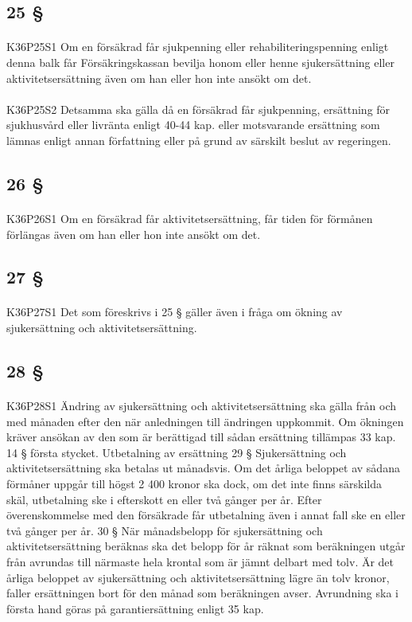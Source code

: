 \documentclass[a4paper,notitlepage,openany,10pt]{book}
\begin{document}
\subsection*{25 §}
\paragraph*{}
{\tiny K36P25S1}
Om en försäkrad får sjukpenning eller rehabiliteringspenning enligt denna balk får Försäkringskassan bevilja honom eller henne sjukersättning eller aktivitetsersättning även om han eller hon inte ansökt om det.
\paragraph*{}
{\tiny K36P25S2}
Detsamma ska gälla då en försäkrad får sjukpenning, ersättning för sjukhusvård eller livränta enligt 40-44 kap.
eller motsvarande ersättning som lämnas enligt annan författning eller på grund av särskilt beslut av regeringen.
\subsection*{26 §}
\paragraph*{}
{\tiny K36P26S1}
Om en försäkrad får aktivitetsersättning, får tiden för förmånen förlängas även om han eller hon inte ansökt om det.
\subsection*{27 §}
\paragraph*{}
{\tiny K36P27S1}
Det som föreskrivs i 25 § gäller även i fråga om ökning av sjukersättning och aktivitetsersättning.
\subsection*{28 §}
\paragraph*{}
{\tiny K36P28S1}
Ändring av sjukersättning och aktivitetsersättning ska gälla från och med månaden efter den när anledningen till ändringen uppkommit. Om ökningen kräver ansökan av den som är berättigad till sådan ersättning tillämpas 33 kap. 14 § första stycket.
Utbetalning av ersättning 29 § Sjukersättning och aktivitetsersättning ska betalas ut månadsvis. Om det årliga beloppet av sådana förmåner uppgår till högst 2 400 kronor ska dock, om det inte finns särskilda skäl, utbetalning ske i efterskott en eller två gånger per år. Efter överenskommelse med den försäkrade får utbetalning även i annat fall ske en eller två gånger per år. 30 § När månadsbelopp för sjukersättning och aktivitetsersättning beräknas ska det belopp för år räknat som beräkningen utgår från avrundas till närmaste hela krontal som är jämnt delbart med tolv. Är det årliga beloppet av sjukersättning och aktivitetsersättning lägre än tolv kronor, faller ersättningen bort för den månad som beräkningen avser. Avrundning ska i första hand göras på garantiersättning enligt 35 kap.
\end{document}

